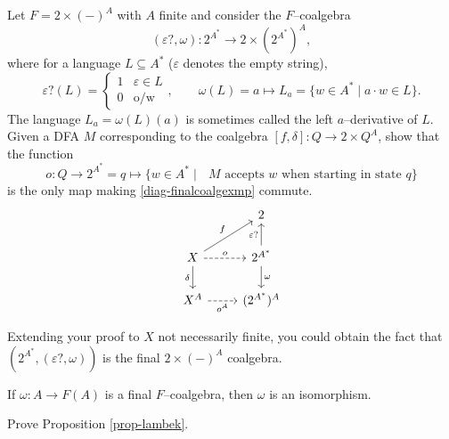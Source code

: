 \documentclass[main.tex]{subfiles}
\begin{document}
\begin{exer}[3pts]\label{exer-finalcoalg}
	 Let $F = 2\times (-)^A$ with $A$ finite and consider the $F$--coalgebra \[(\varepsilon?, \omega): 2^{A^*} \rightarrow 2\times (2^{A^*})^A,\]
	 where for a language $L \subseteq A^*$ ($\varepsilon$ denotes the empty string), \[\varepsilon?(L) = \begin{cases}1 & \varepsilon \in L\\0 & \text{o/w}\end{cases}, \quad \quad \omega(L) = a \mapsto L_a = \{w \in A^* \mid a \cdot w \in L\}.\] The language $L_a = \omega(L)(a)$ is sometimes called the left $a$--derivative of $L$. Given a DFA $M$ corresponding to the coalgebra $[f,\delta]: Q\rightarrow 2\times Q^A$, show that the function 
	 \[o: Q \rightarrow 2^{A^*} = q\mapsto \{w \in A^* \mid \text{ $M$ accepts $w$ when starting in state $q$}\}\] is the only map making \eqref{diag-finalcoalgexmp} commute. 
    \begin{equation}\label{diag-finalcoalgexmp}
    \centering
    \begin{tikzcd}
        & 2                                                     \\
        X \arrow[d, "\delta"'] \arrow[r, "o", dashed] \arrow[ru, "f"] & 2^{A^*} \arrow[d, "\omega"] \arrow[u, "\varepsilon?"] \\
        X^A \arrow[r, "o^A"', dashed]                               & (2^{A^*})^A                                          
    \end{tikzcd}
    \end{equation}
\end{exer}
\begin{rem}
    Extending your proof to $X$ not necessarily finite, you could obtain the fact that $(2^{A^*}, (\varepsilon?, \omega))$ is the final $2\times (-)^A$ coalgebra.
\end{rem}
\begin{prop}\label{prop-lambek}
    If $\omega: A \rightarrow F(A)$ is a final $F$--coalgebra, then $\omega$ is an isomorphism.
\end{prop}
\begin{exer}[0.5pts]
    Prove Proposition \ref{prop-lambek}.
\end{exer}
\end{document}
